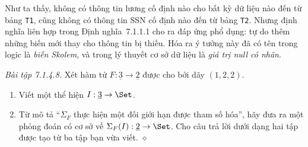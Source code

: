 Như ta thấy, không có thông tin lương cố định nào cho bất kỳ dữ liệu nào đến từ bảng \texttt{T1}, cũng không có thông tin SSN cố định nào đến từ bảng \texttt{T2}. Nhưng định nghĩa liên hợp trong Định nghĩa~7.1.1.1 cho ra đáp ứng phổ dụng: tự do thêm những biến mới thay cho thông tin bị thiếu. Hóa ra ý tưởng này đã có tên trong logic là \emph{biến Skolem}, và trong lý thuyết cơ sở dữ liệu là \emph{giá trị null có nhãn}.

\noindent\textit{Bài tập 7.1.4.8.}\keepwithnext
Xét hàm tử $F:\underline3\to\underline2$ được cho bởi dãy $(1,2,2)$.
\begin{enumerate}[label=\alph*.]
\item Viết một thể hiện $I:\underline3\to\Set$.
\item Từ mô tả ``$\Sigma_F$ thực hiện một đối giới hạn được tham số hóa'', hãy đưa ra một phỏng đoán có cơ sở về $\Sigma_F(I):\underline2\to\Set$. Cho câu trả lời dưới dạng hai tập được tạo từ ba tập bạn vừa viết.
\nobreak\hfill$\diamond$
\end{enumerate}

